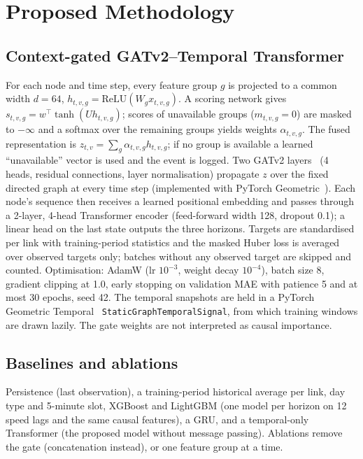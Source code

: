 \section{Proposed Methodology}
\label{sec:method}
\subsection{Context-gated GATv2--Temporal Transformer}
For each node and time step, every feature group $g$ is projected to a common width $d=64$,
$h_{t,v,g}=\mathrm{ReLU}(W_g x_{t,v,g})$. A scoring network gives $s_{t,v,g}=w^\top\tanh(U h_{t,v,g})$; scores of
unavailable groups ($m_{t,v,g}=0$) are masked to $-\infty$ and a softmax over the remaining groups yields weights
$\alpha_{t,v,g}$. The fused representation is $z_{t,v}=\sum_g\alpha_{t,v,g}h_{t,v,g}$; if no group is available a
learned ``unavailable'' vector is used and the event is logged. Two GATv2 layers~\cite{brody2022gatv2} (4 heads,
residual connections, layer normalisation) propagate $z$ over the fixed directed graph at every time step
(implemented with PyTorch Geometric~\cite{fey2019pyg}). Each node's sequence then receives a learned positional
embedding and passes through a 2-layer, 4-head Transformer encoder (feed-forward width 128, dropout 0.1); a linear head on
the last state outputs the three horizons. Targets are standardised per link with training-period statistics and the
masked Huber loss is averaged over observed targets only; batches without any observed target are skipped and
counted. Optimisation: AdamW (lr $10^{-3}$, weight decay $10^{-4}$), batch size 8, gradient clipping at 1.0, early
stopping on validation MAE with patience 5 and at most 30 epochs, seed 42. The temporal snapshots are held in a
PyTorch Geometric Temporal~\cite{rozemberczki2021pgt} \texttt{StaticGraphTemporalSignal}, from which training windows
are drawn lazily. The gate weights are not interpreted as causal importance.

\subsection{Baselines and ablations}
Persistence (last observation), a training-period historical average per link, day type and 5-minute slot, XGBoost and
LightGBM (one model per horizon on 12 speed lags and the same causal features), a GRU, and a temporal-only Transformer
(the proposed model without message passing). Ablations remove the gate (concatenation instead), or one feature group
at a time.


